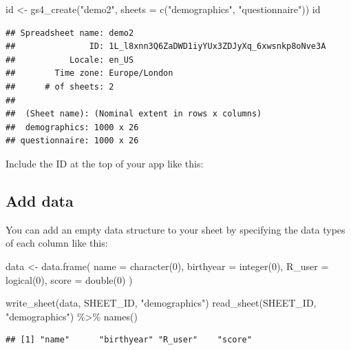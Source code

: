 \documentclass[
  oneside]{book}
\newenvironment{Shaded}{\begin{snugshade}}{\end{snugshade}}
\newcommand{\AttributeTok}[1]{\textcolor[rgb]{0.77,0.63,0.00}{#1}}
\newcommand{\DecValTok}[1]{\textcolor[rgb]{0.00,0.00,0.81}{#1}}
\newcommand{\FunctionTok}[1]{\textcolor[rgb]{0.00,0.00,0.00}{#1}}
\newcommand{\NormalTok}[1]{#1}
\newcommand{\OtherTok}[1]{\textcolor[rgb]{0.56,0.35,0.01}{#1}}
\newcommand{\SpecialCharTok}[1]{\textcolor[rgb]{0.00,0.00,0.00}{#1}}
\newcommand{\StringTok}[1]{\textcolor[rgb]{0.31,0.60,0.02}{#1}}
\begin{document}
\begin{Shaded}
\begin{Highlighting}[]
\NormalTok{id }\OtherTok{\textless{}{-}} \FunctionTok{gs4\_create}\NormalTok{(}\StringTok{"demo2"}\NormalTok{, }\AttributeTok{sheets =} \FunctionTok{c}\NormalTok{(}\StringTok{"demographics"}\NormalTok{, }\StringTok{"questionnaire"}\NormalTok{))}
\NormalTok{id}
\end{Highlighting}
\end{Shaded}

\begin{verbatim}
## Spreadsheet name: demo2
##               ID: 1L_l8xnn3Q6ZaDWD1iyYUx3ZDJyXq_6xwsnkp8oNve3A
##           Locale: en_US
##        Time zone: Europe/London
##      # of sheets: 2
## 
##  (Sheet name): (Nominal extent in rows x columns)
##  demographics: 1000 x 26
## questionnaire: 1000 x 26
\end{verbatim}

Include the ID at the top of your app like this:

\hypertarget{add-data}{%
\subsection{Add data}\label{add-data}}

You can add an empty data structure to your sheet by specifying the data types of each column like this:

\begin{Shaded}
\begin{Highlighting}[]
\NormalTok{data }\OtherTok{\textless{}{-}} \FunctionTok{data.frame}\NormalTok{(}
  \AttributeTok{name =} \FunctionTok{character}\NormalTok{(}\DecValTok{0}\NormalTok{),}
  \AttributeTok{birthyear =} \FunctionTok{integer}\NormalTok{(}\DecValTok{0}\NormalTok{),}
  \AttributeTok{R\_user =} \FunctionTok{logical}\NormalTok{(}\DecValTok{0}\NormalTok{),}
  \AttributeTok{score =} \FunctionTok{double}\NormalTok{(}\DecValTok{0}\NormalTok{)}
\NormalTok{)}

\FunctionTok{write\_sheet}\NormalTok{(data, SHEET\_ID, }\StringTok{"demographics"}\NormalTok{)}
\FunctionTok{read\_sheet}\NormalTok{(SHEET\_ID, }\StringTok{"demographics"}\NormalTok{) }\SpecialCharTok{\%\textgreater{}\%} \FunctionTok{names}\NormalTok{()}
\end{Highlighting}
\end{Shaded}

\begin{verbatim}
## [1] "name"      "birthyear" "R_user"    "score"
\end{verbatim}
\end{document}
